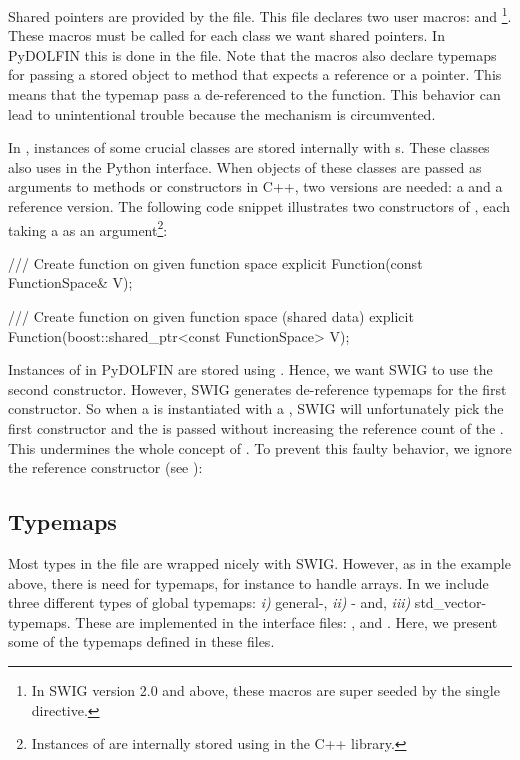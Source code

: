 Shared pointers are provided by the  file. 
This file declares two user macros: \-\-
and \-\-\footnote{In SWIG
version 2.0 and above, these macros are super seeded by the single
 directive.}. These macros must be called for each class we
want shared pointers.  In PyDOLFIN this is done in the  file. 
Note that the macros also declare typemaps for passing a
 stored object to method that expects a reference or
a pointer. This means that the typemap pass a
de-referenced  to the function. This behavior can lead to
unintentional trouble because the  mechanism is circumvented.

In \dolfin, instances of some crucial classes are stored internally with
s. These classes also uses  in the Python
interface. When objects of these classes are passed as arguments to methods
or constructors in C++, two versions are needed: a  and a reference version. The following code snippet illustrates two constructors of , each taking a  as an argument\footnote{Instances of  are internally stored using  in the \dolfin C++ library.}:
\begin{c++}
/// Create function on given function space
explicit Function(const FunctionSpace& V);

/// Create function on given function space (shared data)
explicit Function(boost::shared_ptr<const FunctionSpace> V);
\end{c++}
Instances of  in PyDOLFIN are stored using
. Hence, we want SWIG to use the second constructor. However, 
SWIG generates de-reference typemaps for the first constructor. So when a
 is instantiated with a , SWIG will
unfortunately pick the first constructor and the  is
passed without increasing the reference count of the .
This undermines the whole concept of . To prevent this
faulty behavior, we ignore the reference constructor (see ):
\begin{swigcode}
\end{swigcode}

\subsection{Typemaps}
Most types in the  file are wrapped nicely
with SWIG. However, as in the  example above, there is need for 
typemaps, for instance to handle \numpy arrays.  
In  we include three different types of global typemaps:
\textit{i)} general-, \textit{ii)} \numpy- and, \textit{iii)}
std\_vector-typemaps. These are implemented in the interface files:
,  and
. Here, we present some of the typemaps defined in these files.

